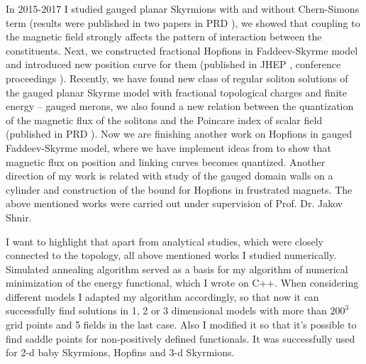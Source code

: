 \documentclass[paper=a4,fontsize=11pt]{scrartcl} %
\begin{document}
In 2015-2017 I studied gauged planar Skyrmions with and without Chern-Simons term (results were published in two papers in PRD \cite{GaugedBaby,GaugedBabyCS}), we showed that coupling to the magnetic field strongly affects the pattern of interaction between the constituents. Next, we constructed fractional Hopfions in Faddeev-Skyrme model and introduced new position curve for them (published in JHEP \cite{FractionalHopf}, conference proceedings \cite{SkyrmeFamily}). Recently, we have found new class of regular soliton solutions of the gauged planar Skyrme model with fractional topological charges and finite energy -- gauged merons, we also found a new relation between the quantization of the magnetic flux of the solitons and the Poincare index of scalar field (published in PRD \cite{GaugedMerons}). Now we are finishing another work on Hopfions in gauged Faddeev-Skyrme model, where we have implement ideas from \cite{GaugedMerons} to show that magnetic flux on position and linking curves becomes quantized. Another direction of my work is related with study of the gauged domain walls on a cylinder and construction of the bound for Hopfions in frustrated magnets. The above mentioned works were carried out under supervision of Prof. Dr. Jakov Shnir.

I want to highlight that apart from analytical studies, which were closely connected to the topology, all above mentioned works I studied numerically. Simulated annealing algorithm served as a basis for my algorithm of numerical minimization of the energy functional, which I wrote on C++. When considering different models I adapted my algorithm accordingly, so that now it can successfully find solutions in 1, 2 or 3 dimensional models with more than $200^3$ grid points and 5 fields in the last case. Also I modified it so that it's possible to find saddle points for non-positively defined functionals. It was successfully used for 2-d baby Skyrmions, Hopfins and 3-d Skyrmions.



%
\end{document}
